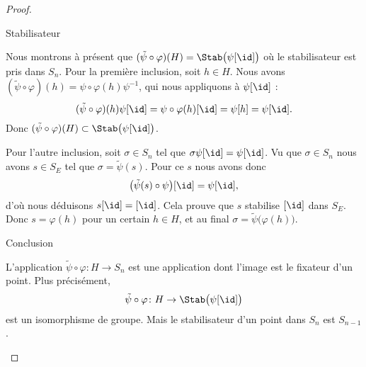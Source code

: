 \begin{proof}
\begin{subproof}
\begin{subproof}
                \item[Stabilisateur]

                    Nous montrons à présent que \( (\tilde \psi\circ\varphi)(H)=\Stab\big( \psi[\id] \big)\) où le stabilisateur est pris dans \( S_n\). Pour la première inclusion, soit \( h\in H\). Nous avons \( (\tilde \psi\circ\varphi)(h)=\psi\circ\varphi(h)\psi^{-1}\), qui nous appliquons à \( \psi[\id]\) :
                    \begin{equation}
                        (\tilde \psi\circ\varphi)(h)\psi[\id]=\psi\circ\varphi(h)[\id]=\psi[h]=\psi[\id].
                    \end{equation}
                    Donc \( (\tilde \psi\circ\varphi)(H)\subset\Stab\big( \psi[\id] \big)\).

                    Pour l'autre inclusion, soit \( \sigma\in S_n\) tel que \( \sigma\psi[\id]=\psi[\id]\). Vu que \( \sigma\in S_n\) nous avons \( s\in S_E\) tel que \( \sigma=\tilde \psi(s)\). Pour ce \( s\) nous avons donc
                    \begin{equation}
                        \big( \tilde \psi(s)\circ\psi \big)[\id]=\psi[\id],
                    \end{equation}
                    d'où nous déduisons \( s[\id]=[\id]\). Cela prouve que \( s\) stabilise \( [\id]\) dans \( S_E\). Donc \( s=\varphi(h)\) pour un certain \( h\in H\), et au final \( \sigma=\tilde \psi\big( \varphi(h) \big)\).

                \item[Conclusion]

                    L'application \( \tilde \psi\circ\varphi\colon H\to S_n\) est une application dont l'image est le fixateur d'un point. Plus précisément,
                    \begin{equation}
                        \tilde \psi\circ\varphi\colon H\to \Stab\big( \psi[\id] \big)
                    \end{equation}
                    est un isomorphisme de groupe. Mais le stabilisateur d'un point dans \( S_n\) est \( S_{n-1}\).

            \end{subproof}

    \end{subproof}
\end{proof}

